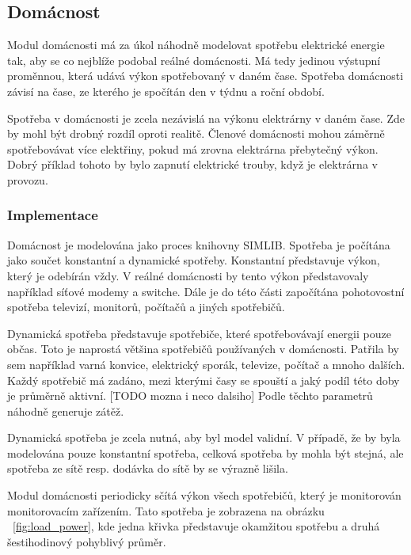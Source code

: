 \documentclass[12pt,a4paper]{article}
\begin{document}
\subsection{Domácnost}
Modul domácnosti má za úkol náhodně modelovat spotřebu elektrické energie tak,
aby se co nejblíže podobal reálné domácnosti.
Má tedy jedinou výstupní proměnnou, která udává výkon spotřebovaný v daném čase.
Spotřeba domácnosti závisí na čase, ze kterého je spočítán den v týdnu a roční období.

Spotřeba v domácnosti je zcela nezávislá na výkonu elektrárny v daném čase.
Zde by mohl být drobný rozdíl oproti realitě.
Členové domácnosti mohou záměrně spotřebovávat více elektřiny, pokud má zrovna elektrárna přebytečný výkon.
Dobrý příklad tohoto by bylo zapnutí elektrické trouby, když je elektrárna v provozu.

\subsubsection{Implementace}
Domácnost je modelována jako proces knihovny SIMLIB.
Spotřeba je počítána jako součet konstantní a dynamické spotřeby.
Konstantní představuje výkon, který je odebírán vždy.
V reálné domácnosti by tento výkon představovaly například síťové modemy a switche.
Dále je do této části započítána pohotovostní spotřeba televizí, monitorů, počítačů a jiných spotřebičů.

Dynamická spotřeba představuje spotřebiče, které spotřebovávají energii pouze občas.
Toto je naprostá většina spotřebičů používaných v domácnosti.
Patřila by sem například varná konvice, elektrický sporák, televize, počítač a mnoho dalších.
Každý spotřebič má zadáno, mezi kterými časy se spouští a jaký podíl této doby je průměrně aktivní. [TODO mozna i neco dalsiho]
Podle těchto parametrů náhodně generuje zátěž.

Dynamická spotřeba je zcela nutná, aby byl model validní.
V případě, že by byla modelována pouze konstantní spotřeba,
celková spotřeba by mohla být stejná, ale spotřeba ze sítě resp. dodávka do sítě by se výrazně lišila.

Modul domácnosti periodicky sčítá výkon všech spotřebičů, který je monitorován monitorovacím zařízením.
Tato spotřeba je zobrazena na obrázku ~\ref{fig:load_power},
kde jedna křivka představuje okamžitou spotřebu a druhá šestihodinový pohyblivý průměr.
\end{document}

